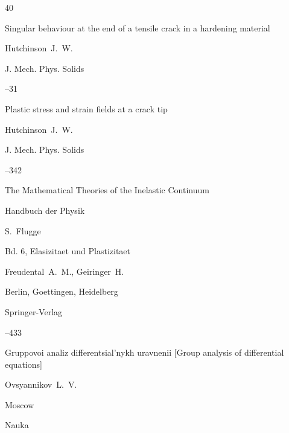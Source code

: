 \begin{thebibliography}{40}

\paper Singular behaviour at the end of a tensile crack in a hardening material

\by    Hutchinson~J.~W.

\jour J. Mech. Phys. Solids




--31





\paper Plastic stress and strain fields at a crack tip

\by    Hutchinson~J.~W.

\jour J. Mech. Phys. Solids




--342





\paper The Mathematical Theories of the Inelastic Continuum

\inbook Handbuch der Physik

\ed S.~Flugge

\bookinfo Bd. 6, Elasizitaet und Plastizitaet

\by Freudental~A.~M., Geiringer~H.

\publaddr Berlin, Goettingen, Heidelberg

\publ Springer-Verlag


--433


	 


\book Gruppovoi analiz differentsial'nykh uravnenii \rm [Group analysis of differential equations]

\by Ovsyannikov~L.~V.

\publaddr Moscow

\publ Nauka




\end{thebibliography}
